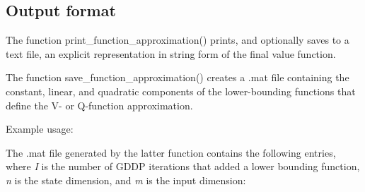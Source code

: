 \subsection*{Output format}

The function {\ttfamily print\+\_\+function\+\_\+approximation()} prints, and optionally saves to a text file, an explicit representation in string form of the final value function.

The function {\ttfamily save\+\_\+function\+\_\+approximation()} creates a .mat file containing the constant, linear, and quadratic components of the lower-\/bounding functions that define the V-\/ or Q-\/function approximation.

Example usage\+:


\begin{DoxyCode}{0}
\end{DoxyCode}


The .mat file generated by the latter function contains the following entries, where {\itshape I} is the number of G\+D\+DP iterations that added a lower bounding function, {\itshape n} is the state dimension, and {\itshape m} is the input dimension\+:

